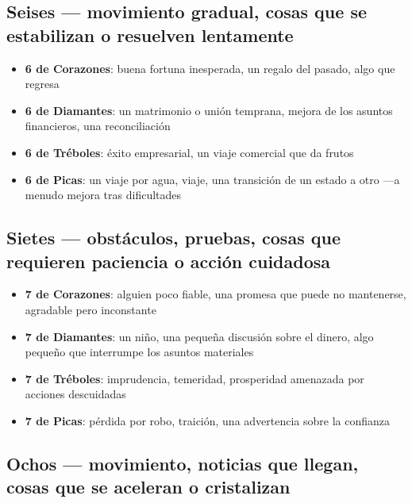\subsection{Seises --- movimiento gradual, cosas que se estabilizan o resuelven lentamente}\label{sixes--gradual-movement-things-stabilizing-or-resolving-slowly}

\begin{itemize}
\tightlist
\item
  \textbf{6 de Corazones}: buena fortuna inesperada, un regalo del pasado, algo que regresa
\item
  \textbf{6 de Diamantes}: un matrimonio o unión temprana, mejora de los asuntos financieros, una reconciliación
\item
  \textbf{6 de Tréboles}: éxito empresarial, un viaje comercial que da frutos
\item
  \textbf{6 de Picas}: un viaje por agua, viaje, una transición de un estado a otro ---a menudo mejora tras dificultades
\end{itemize}

\subsection{Sietes --- obstáculos, pruebas, cosas que requieren paciencia o acción cuidadosa}\label{sevens--obstacles-tests-things-requiring-patience-or-careful-action}

\begin{itemize}
\tightlist
\item
  \textbf{7 de Corazones}: alguien poco fiable, una promesa que puede no mantenerse, agradable pero inconstante
\item
  \textbf{7 de Diamantes}: un niño, una pequeña discusión sobre el dinero, algo pequeño que interrumpe los asuntos materiales
\item
  \textbf{7 de Tréboles}: imprudencia, temeridad, prosperidad amenazada por acciones descuidadas
\item
  \textbf{7 de Picas}: pérdida por robo, traición, una advertencia sobre la confianza
\end{itemize}

\subsection{Ochos --- movimiento, noticias que llegan, cosas que se aceleran o cristalizan}\label{eights--movement-news-arriving-things-accelerating-or-crystallizing}

